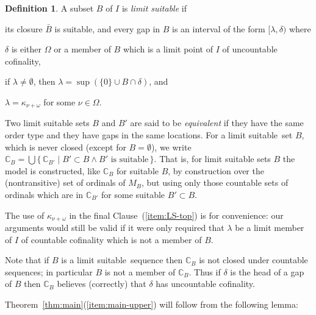 \documentclass[
twoside,
]{article}
\newenvironment{myinparaenum}{\begin{inparaenum}[\upshape(i)]
}{\end{inparaenum}}
\theoremstyle{definition}
\newtheorem{definition}[theorem]{Definition}
\theoremstyle{remark}
\newcommand{\LS}{limit suitable}
\newcommand{\ords}{\Omega}
\newcommand{\sing}[1]{\{#1\}}
\newcommand{\set}[1]{\{\,#1\,\}}
\newcommand\chang{\mathbb{C}}
\begin{document}
\begin{definition}
  \label{def:limitsuitable}
  A subset $B$ of $I$ is \emph{\LS} if
  \begin{myinparaenum}
  \item\label{item:LS-suitable} its closure $\bar B$ is suitable,  and 
    \label{item:LS-gaps} every gap in $B$ is an interval of the
    form $[\lambda,\delta)$ where
  \item $\delta$ is either $\ords$ or a member of $B$ which is a limit
    point of $I$ of uncountable cofinality, 
  \item if $\lambda\not=\emptyset$, then $\lambda=\sup(\sing{0}\cup
    B\cap\delta)$, and  
  \item\label{item:LS-top}
    $\lambda=\kappa_{\nu+\omega}$ for some $\nu\in\ords$.
  \end{myinparaenum}

  Two \LS{} sets $B$ and $B'$ are said to be \emph{equivalent} if they have
  the same order type and they have gaps in the same locations.
  For a \LS\  set $B$, which is never closed (except for
  $B=\emptyset$), we write
  $\chang_{B}=\bigcup\set{\chang_{B'}\mid B'\subset B\land B'\text{ is suitable}}$. 
  That is, for limit suitable sets $B$ the model is constructed, like
  $\chang_B$ for suitable $B$, by construction over the
  (nontransitive) set of ordinals of $M_B$, but using only those
  countable sets of ordinals which are in $\chang_{B'}$ for some
  suitable $B'\subset B$. 
\end{definition}

The use of $\kappa_{\nu+\omega}$ in the final Clause~(\ref{item:LS-top}) is for
convenience: our arguments would still be valid if it were only required
that $\lambda$ be a limit member of $I$ of countable cofinality which
is not a member of $B$.

Note that if $B$ is a \LS\ sequence then $\chang_{B}$ is not closed
under countable sequences; in particular $B$ is not a member of $\chang_B$.
Thus if $\delta$ is the head of a gap of $B$ then $\chang_{B}$
believes (correctly)  that $\delta$  has
uncountable cofinality.

Theorem~\ref{thm:main}(\ref{item:main-upper}) will follow  from the following
lemma: 
\end{document}
